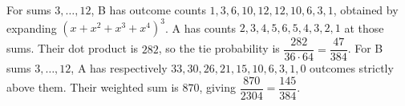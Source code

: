 For sums $3,\ldots,12$, B has outcome counts $1,3,6,10,12,12,10,6,3,1$, obtained by expanding $(x+x^2+x^3+x^4)^3$. A has counts $2,3,4,5,6,5,4,3,2,1$ at those sums. Their dot product is $282$, so the tie probability is $\boxed{\dfrac{282}{36\cdot64}=\dfrac{47}{384}}$.
For B sums $3,\ldots,12$, A has respectively $33,30,26,21,15,10,6,3,1,0$ outcomes strictly above them. Their weighted sum is $870$, giving $\boxed{\dfrac{870}{2304}=\dfrac{145}{384}}$.
